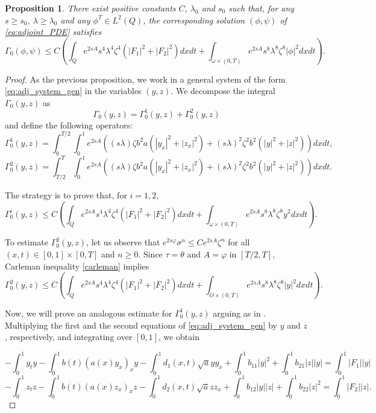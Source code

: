 \documentclass[11pt,oneside,a4papper]{osajnl}
\newtheorem{propo}{Proposition}
\begin{document}
\begin{propo} %
\label{prop:carleman}
There exist positive constants $C$, $\lambda_0$ and $s_0$ such that, for any $s \geq s_0$, $\lambda \geq \lambda_0$ and any $\phi^T\in L^2(Q)$, the corresponding solution $(\phi,\psi)$ of \eqref{eq:adjoint_PDE} satisfies
$$
\Gamma_0(\phi,\psi) \leq C \left( \int_Q e^{2s A} s^4 \lambda^4 \zeta^4 (|F_1|^2+|F_2|^2)dxdt + \int_{\omega \times (0,T)} e^{2s A} s^8 \lambda^8 \zeta^8 |\phi|^2 dxdt\right).
$$
\end{propo}
\begin{proof}
As the previous proposition, we work in a general system of the form \eqref{eq:adj_system_gen} in the variables $(y,z)$. 
We decompose the integral $\Gamma_0(y,z)$ as	
	$$\Gamma_0(y,z)=
	\Gamma^1_0(y,z)+\Gamma^2_0(y,z)$$
and define the following operators:
$$
\Gamma^1_0(y,z) =\int_{0}^{T/2}\int_{0}^{1} e^{2s A}((s\lambda) \zeta b^2 a (|y_x|^2 + |z_x|^2) + (s\lambda)^2 {\zeta}^2 b^2 (|y|^2 + |z|^2))dxdt,
$$
$$
	\Gamma^2_0(y,z) =\int_{T/2}^{T}\int_{0}^{1} e^{2s A}((s\lambda) \zeta b^2 a (|y_x|^2 + |z_x|^2) + (s\lambda)^2 {\zeta}^2 b^2 (|y|^2 + |z|^2))dxdt.
$$

The strategy is to prove that, for $i=1,2$,
$$
\Gamma^i_0(y,z)\leq C \left( \int_Q e^{2sA} s^4 \lambda^4 \zeta^4 (|F_1|^2+|F_2|^2)dxdt + \int_{\omega \times (0,T)} e^{2sA} s^8 \lambda^8 \zeta^8 y^2 dxdt \right).
$$
    
To estimate $\Gamma^2_0(y,z)$, let us observe that $e^{2s\varphi}\sigma^n\leq Ce^{2sA}\zeta^n$ for all $(x,t)\in [0,1]\times[0,T]$ and $n\geq 0$. Since $\tau=\theta$ and $A=\varphi$ in $[T/2, T]$, Carleman inequality \eqref{carleman} implies	
$$\Gamma^2_0(y,z) \leq C \left( \int_Q e^{2sA} s^4 \lambda^4 \zeta^4 (|F_1|^2+|F_2|^2)dxdt + \int_{O\times(0,T)} e^{2sA} s^8 \lambda^8 \zeta^8 |y|^2dxdt \right).$$
     
Now, we will prove an analogous estimate for $\Gamma^1_0(y,z)$ arguing as in \cite{DemarqueLimacoViana_deg_sys2020}. Multiplying the first and the second equations of \eqref{eq:adj_system_gen} by $y$ and $z$, respectively, and integrating over $[0, 1]$, we obtain	
	
$$-\int_{0}^{1}y_ty - \int_{0}^{1}b(t)(a(x)y_x)_x y - \int_{0}^{1}d_1(x,t)\sqrt{a}y y_x + \int_{0}^{1}b_{11}|y|^2 + \int_{0}^{1}b_{21}|z||y| =\int_{0}^{1} |F_1| |y| $$
$$-\int_{0}^{1}z_tz - \int_{0}^{1}b(t)(a(x)z_x)_x z - \int_{0}^{1}d_2(x,t)\sqrt{a}z z_x + \int_{0}^{1}b_{12}|y||z| + \int_{0}^{1}b_{22}|z|^2 =\int_{0}^{1} |F_2| |z|.$$


\end{proof}
\end{document}
